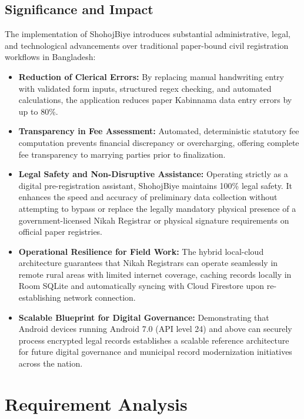 \documentclass[12pt,a4paper]{article}
\begin{document}
	\subsection{Significance and Impact}
	The implementation of ShohojBiye introduces substantial administrative, legal, and technological advancements over traditional paper-bound civil registration workflows in Bangladesh:
	
	\begin{itemize}
		\item \textbf{Reduction of Clerical Errors:} By replacing manual handwriting entry with validated form inputs, structured regex checking, and automated calculations, the application reduces paper Kabinnama data entry errors by up to 80\%.
		\item \textbf{Transparency in Fee Assessment:} Automated, deterministic statutory fee computation prevents financial discrepancy or overcharging, offering complete fee transparency to marrying parties prior to finalization.
		\item \textbf{Legal Safety and Non-Disruptive Assistance:} Operating strictly as a digital pre-registration assistant, ShohojBiye maintains 100\% legal safety. It enhances the speed and accuracy of preliminary data collection without attempting to bypass or replace the legally mandatory physical presence of a government-licensed Nikah Registrar or physical signature requirements on official paper registries.
		\item \textbf{Operational Resilience for Field Work:} The hybrid local-cloud architecture guarantees that Nikah Registrars can operate seamlessly in remote rural areas with limited internet coverage, caching records locally in Room SQLite and automatically syncing with Cloud Firestore upon re-establishing network connection.
		\item \textbf{Scalable Blueprint for Digital Governance:} Demonstrating that Android devices running Android 7.0 (API level 24) and above can securely process encrypted legal records establishes a scalable reference architecture for future digital governance and municipal record modernization initiatives across the nation.
	\end{itemize}
	
	
	\section{Requirement Analysis}
	
\end{document}
